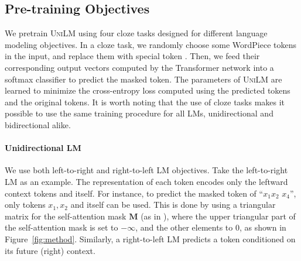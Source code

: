 \documentclass{article}
\newcommand\ours{\textsc{UniLM}}
\begin{document}
\subsection{Pre-training Objectives}
\label{sec:pretrain}


We pretrain \ours{} using four cloze tasks designed for different language modeling objectives.
In a cloze task, 
we randomly choose some WordPiece tokens in the input, and replace them with special token . 
Then, we feed their corresponding output vectors computed by the Transformer network into a softmax classifier to predict  the masked token. 
The parameters of \ours{} are learned to minimize the cross-entropy loss computed using the predicted tokens and the original tokens.
It is worth noting that the use of cloze tasks makes it possible to use the same training procedure for all LMs, unidirectional and bidirectional alike.


\paragraph{Unidirectional LM}
\label{sec:uni:lm}

We use both left-to-right and right-to-left LM objectives.
Take the left-to-right LM as an example. 
The representation of each token encodes %
only the leftward context tokens and itself.
For instance, to predict the masked token of ``$x_1 x_2$  $x_4$'', only tokens $x_1, x_2$ and itself can be used.
This is done by using a triangular matrix for the self-attention mask $\mathbf{M}$ (as in ), 
where the upper triangular part of the self-attention mask is set to $-\infty$, and the other elements to $0$, as shown in Figure~\ref{fig:method}.
Similarly, a right-to-left LM predicts a token conditioned on its future (right) context.
\end{document}
